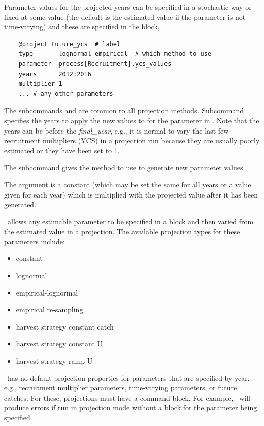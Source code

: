 Parameter values for the projected years can be specified in a stochastic way or fixed at some value (the default is the estimated value if the parameter is not time-varying) and these are specified in the  block,

{\small{\begin{verbatim}
	@project Future_ycs  # label
	type       lognormal_empirical  # which method to use
	parameter  process[Recruitment].ycs_values
	years      2012:2016
	multiplier 1
	... # any other parameters
\end{verbatim}}}

The subcommands  and  are common to all projection methods. Subcommand  specifies the years to apply the new values to for the parameter in . Note that the years can be before the \textit{final\_year}, e.g., it is normal to vary the last few recruitment multipliers (YCS) in a projection run because they are usually poorly estimated or they have been set to 1.  

The  subcommand gives the method to use to generate new parameter values.

The argument  is a constant (which may be set the same for all years or a value given for each year) which is multiplied with the projected value after it has been generated. 

\CNAME\ allows any estimable parameter to be specified in a  block and then varied from the estimated value in a projection. The available projection types for these parameters include:

\begin{itemize}
	\item constant
	\item lognormal
	\item empirical-lognormal
	\item empirical re-sampling
	\item harvest strategy constant catch
	\item harvest strategy constant U
	\item harvest strategy ramp U
\end{itemize}

\CNAME\ has no default projection properties for parameters that are specified by year, e.g., recruitment multiplier parameters, time-varying parameters, or future catches. For these, projections  must have a  command block. For example, \CNAME\ will produce errors if run in projection mode without a  block for the  parameter being specified.

